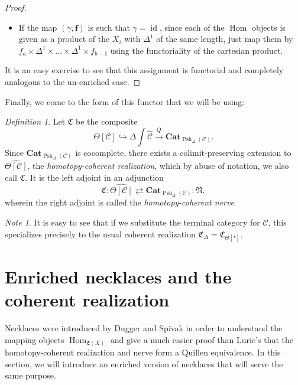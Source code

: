 \documentclass{amsart}
\numberwithin{equation}{section}
\theoremstyle{plain}   %
\theoremstyle{remark}
\newtheorem{note}[subsection]{Note}
\newtheorem{defn}[subsection]{Definition}
\theoremstyle{plain}
\DeclareMathOperator{\id}{id}
\newcommand{\Cat}{\ensuremath{\mathbf{Cat}}}
\DeclareMathOperator{\Hom}{Hom}
\newcommand{\psh}[1]{\ensuremath{\widehat{#1}}}
\newcommand{\C}{\ensuremath{\mathcal{C}}}
\newcommand{\cellset}{\ensuremath{\widehat{\Theta[\mathcal{C}]}}}
\newcommand{\spsh}{\ensuremath{\operatorname{Psh}_\Delta(\mathcal{C})}}
\begin{document}
\begin{proof}
\begin{itemize}
		\item If the map \((\gamma,\mathbf{f})\) is such that \(\gamma=\id\), since each of the \(\Hom\) objects is given as a product of the \(X_i\) with \(\Delta^1\) of the same length, just map them by \(f_a\times\Delta^1\times \dots \times\Delta^1 \times f_{b-1}\) using the functoriality of the cartesian product.
	\end{itemize}
	It is an easy exercise to see that this assignment is functorial and completely analogous to the un-enriched case.
\end{proof}

Finally, we come to the form of this functor that we will be using:

\begin{defn} Let \(\mathfrak{C}\) be the composite \[\Theta[\C]\hookrightarrow\Delta\int \psh{\C} \xrightarrow{Q} \Cat_{\spsh}.\] Since \(\Cat_{\spsh}\) is cocomplete, there exists a colimit-preserving extension to \(\cellset\), the \emph{homotopy-coherent realization}, which by abuse of notation, we also call \(\mathfrak{C}\).  It is the left adjoint in an adjunction \[\mathfrak{C}:\cellset\rightleftarrows \Cat_{\spsh}:\mathfrak{N},\]  wherein the right adjoint is called the \emph{homotopy-coherent nerve}.
\end{defn}

\begin{note}
	It is easy to see that if we substitute the terminal category for \(\C\), this specializes precisely to the usual coherent realization \(\mathfrak{C}_{\Delta} = \mathfrak{C}_{\Theta[\ast]}\).  
\end{note}

\section{Enriched necklaces and the coherent realization}
Necklaces were introduced by Dugger and Spivak in order to understand the mapping objects \(\Hom_{\mathfrak{C}(X)}\) and give a much easier proof than Lurie's that the homotopy-coherent realization and nerve form a Quillen equivalence.  In this section, we will introduce an enriched version of necklaces that will serve the same purpose.
\end{document}
